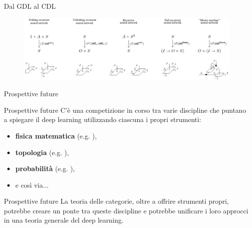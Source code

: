 \documentclass{beamer}
\begin{document}
\begin{frame}{Dal GDL al CDL}
    \begin{figure}
        \begin{center}
            \includegraphics[width=1\textwidth]{figures/cells.png}
            \caption*{\cite{gavranovicposition}}
        \end{center}
    \end{figure}
\end{frame}

\begin{frame}[standout]
    \huge Prospettive future
\end{frame}

\begin{frame}{Prospettive future}
    C'è una competizione in corso tra varie discipline che puntano a spiegare il deep learning utilizzando ciascuna i propri strumenti:
    \begin{itemize}
        \item<1-> \textbf{fisica matematica} {\footnotesize (e.g. \cite{roberts2022principles})},
        \item<2-> \textbf{topologia} {\footnotesize (e.g. \cite{hensel2021survey})},
        \item<3-> \textbf{probabilità} {\footnotesize (e.g. \cite{patel2015probabilistic})},
        \item<4-> e così via...
    \end{itemize}
    
\end{frame}

\begin{frame}{Prospettive future}
    La teoria delle categorie, oltre a offrire strumenti propri, potrebbe creare un ponte tra queste discipline e potrebbe unificare i loro approcci in una teoria generale del deep learning.
\end{frame}

\begin{frame}[allowframebreaks]
    \printbibliography
\end{frame}
\end{document}
